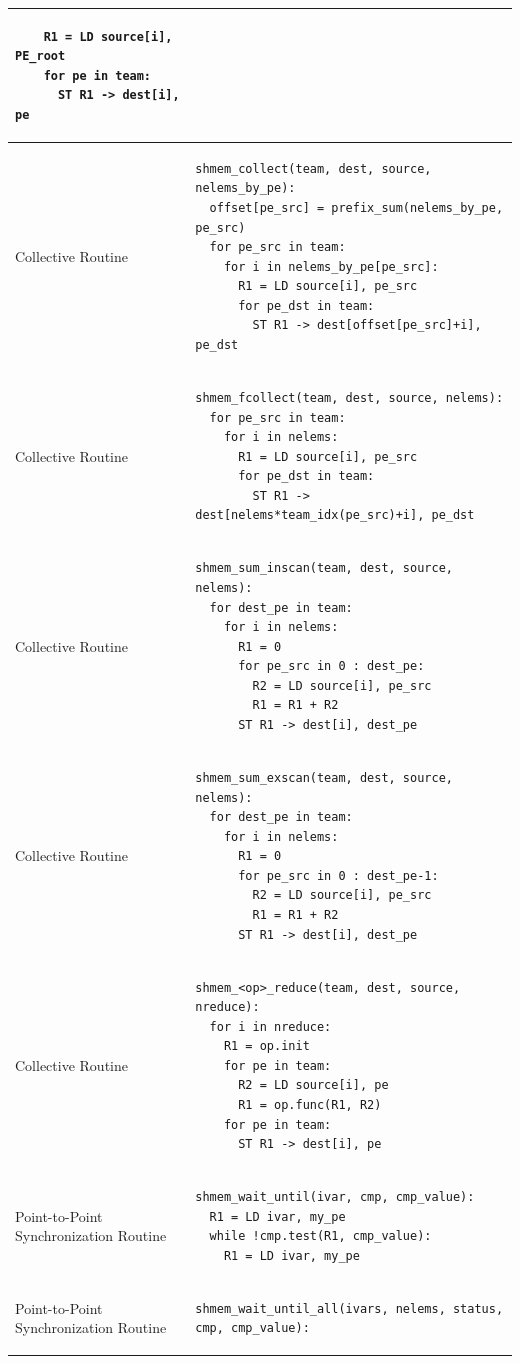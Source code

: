 \begin{longtable}{|m{}|m{}|}
\begin{BVerbatim}
    R1 = LD source[i], PE_root
    for pe in team:
      ST R1 -> dest[i], pe
    \end{BVerbatim}
    \tabularnewline\hline
Collective Routine
    & \begin{BVerbatim}
shmem_collect(team, dest, source, nelems_by_pe):
  offset[pe_src] = prefix_sum(nelems_by_pe, pe_src)
  for pe_src in team:
    for i in nelems_by_pe[pe_src]:
      R1 = LD source[i], pe_src
      for pe_dst in team:
        ST R1 -> dest[offset[pe_src]+i], pe_dst
    \end{BVerbatim}
    \tabularnewline\hline
Collective Routine
    & \begin{BVerbatim}
shmem_fcollect(team, dest, source, nelems):
  for pe_src in team:
    for i in nelems:
      R1 = LD source[i], pe_src
      for pe_dst in team:
        ST R1 -> dest[nelems*team_idx(pe_src)+i], pe_dst
    \end{BVerbatim}
    \tabularnewline\hline
Collective Routine
    & \begin{BVerbatim}
shmem_sum_inscan(team, dest, source, nelems):
  for dest_pe in team:
    for i in nelems:
      R1 = 0
      for pe_src in 0 : dest_pe:
        R2 = LD source[i], pe_src
        R1 = R1 + R2
      ST R1 -> dest[i], dest_pe
    \end{BVerbatim}
    \tabularnewline\hline
Collective Routine
    & \begin{BVerbatim}
shmem_sum_exscan(team, dest, source, nelems):
  for dest_pe in team:
    for i in nelems:
      R1 = 0
      for pe_src in 0 : dest_pe-1:
        R2 = LD source[i], pe_src
        R1 = R1 + R2
      ST R1 -> dest[i], dest_pe
    \end{BVerbatim}
    \tabularnewline\hline
Collective Routine
    & \begin{BVerbatim}
shmem_<op>_reduce(team, dest, source, nreduce):
  for i in nreduce:
    R1 = op.init
    for pe in team:
      R2 = LD source[i], pe
      R1 = op.func(R1, R2)
    for pe in team:
      ST R1 -> dest[i], pe
    \end{BVerbatim}
    \tabularnewline\hline
Point-to-Point Synchronization Routine
    & \begin{BVerbatim}
shmem_wait_until(ivar, cmp, cmp_value):
  R1 = LD ivar, my_pe
  while !cmp.test(R1, cmp_value):
    R1 = LD ivar, my_pe
    \end{BVerbatim}
    \tabularnewline\hline
Point-to-Point Synchronization Routine
    & \begin{BVerbatim}
shmem_wait_until_all(ivars, nelems, status,
cmp, cmp_value):

\end{BVerbatim}
\end{longtable}
